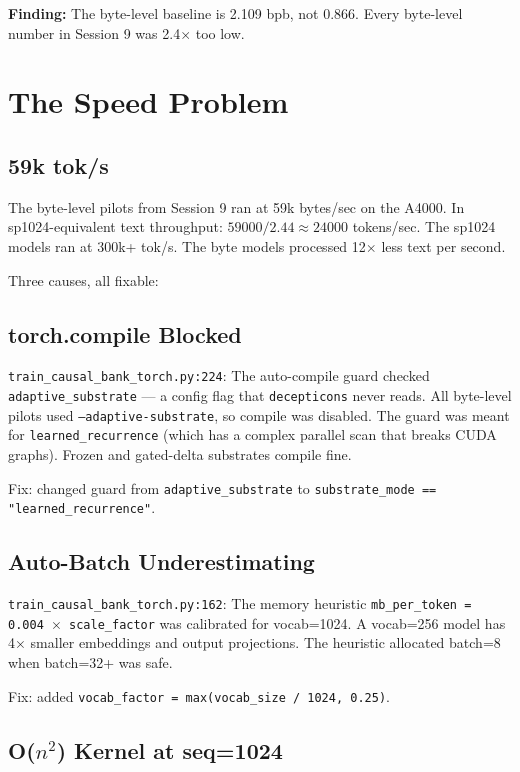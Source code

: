 \documentclass[11pt,a4paper]{report}
\newcommand{\finding}[1]{\textcolor{finding}{\textbf{Finding:}} #1}
\begin{document}
\finding{The byte-level baseline is 2.109 bpb, not 0.866. Every byte-level number in Session 9 was 2.4$\times$ too low.}


\chapter{The Speed Problem}

\section{59k tok/s}

The byte-level pilots from Session 9 ran at 59k bytes/sec on the A4000. In sp1024-equivalent text throughput: $59000 / 2.44 \approx 24000$ tokens/sec. The sp1024 models ran at 300k+ tok/s. The byte models processed 12$\times$ less text per second.

Three causes, all fixable:

\section{torch.compile Blocked}

\texttt{train\_causal\_bank\_torch.py:224}: The auto-compile guard checked \texttt{adaptive\_substrate} --- a config flag that \texttt{decepticons} never reads. All byte-level pilots used \texttt{--adaptive-substrate}, so compile was disabled. The guard was meant for \texttt{learned\_recurrence} (which has a complex parallel scan that breaks CUDA graphs). Frozen and gated-delta substrates compile fine.

Fix: changed guard from \texttt{adaptive\_substrate} to \texttt{substrate\_mode == "learned\_recurrence"}.

\section{Auto-Batch Underestimating}

\texttt{train\_causal\_bank\_torch.py:162}: The memory heuristic \texttt{mb\_per\_token = 0.004 $\times$ scale\_factor} was calibrated for vocab=1024. A vocab=256 model has 4$\times$ smaller embeddings and output projections. The heuristic allocated batch=8 when batch=32+ was safe.

Fix: added \texttt{vocab\_factor = max(vocab\_size / 1024, 0.25)}.

\section{O($n^2$) Kernel at seq=1024}
\end{document}
